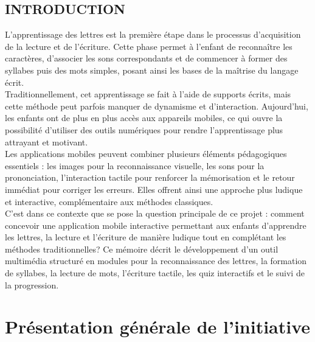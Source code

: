 \documentclass[a4paper,oneside,12pt]{book}
\begin{document}
\chapter*{INTRODUCTION}
\fancyhead[LE,LO]{\leftmark}
\fancyfoot[c]{}

 L'apprentissage des lettres est la première étape dans le processus d'acquisition de la lecture et de l'écriture. Cette phase permet à l'enfant de reconnaître les caractères, d'associer les sons correspondants et de commencer à former des syllabes puis des mots simples, posant ainsi les bases de la maîtrise du langage écrit.\\
 
 Traditionnellement, cet apprentissage se fait à l'aide de supports écrits, mais cette méthode peut parfois manquer de dynamisme et d'interaction. Aujourd'hui, les enfants ont de plus en plus accès aux appareils mobiles, ce qui ouvre la possibilité d'utiliser des outils numériques pour rendre l'apprentissage plus attrayant et motivant.\\
 
Les applications mobiles peuvent combiner plusieurs éléments pédagogiques essentiels : les images pour la reconnaissance visuelle, les sons pour la prononciation, l'interaction tactile pour renforcer la mémorisation et le retour immédiat pour corriger les erreurs. Elles offrent ainsi une approche plus ludique et interactive, complémentaire aux méthodes classiques.\\
 
 C'est dans ce contexte que se pose la question principale de ce projet : comment concevoir une application mobile interactive permettant aux enfants d'apprendre les lettres, la lecture et l'écriture de manière ludique tout en complétant les méthodes traditionnelles? Ce mémoire décrit le développement d'un outil multimédia structuré en modules pour la reconnaissance des lettres, la formation de syllabes, la lecture de mots, l'écriture tactile, les quiz interactifs et le suivi de la progression.


\pagestyle{fancy}
\cfoot{\textbf{\thepage}}
\lhead{}
\rhead{}

\part{Présentation générale de l’initiative}\label{part1}
\end{document}
